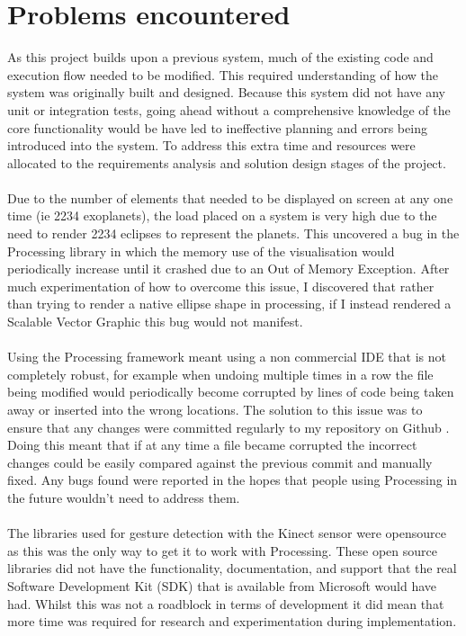 \section{Problems encountered}

As this project builds upon a previous system, much of the existing code and
execution flow needed to be modified. This required understanding of how the
system was originally built and designed. Because this system did not have any
unit or integration tests, going ahead without a comprehensive knowledge of the
core functionality would be have led to ineffective planning and errors being
introduced into the system. To address this extra time and resources were
allocated to the requirements analysis and solution design stages of the
project.
\\\\
Due to the number of elements that needed to be displayed on screen at any one
time (ie 2234 exoplanets), the load placed on a system is very high due to the
need to render 2234 eclipses to represent the planets. This uncovered a bug in
the Processing library in which the memory use of the visualisation would
periodically increase until it crashed due to an Out of Memory Exception. After
much experimentation of how to overcome this issue, I discovered that rather
than trying to render a native ellipse shape in processing, if I instead
rendered
a Scalable Vector Graphic this bug would not manifest. 
\\\\
Using the Processing framework meant using a non commercial IDE that is not
completely robust, for example when undoing multiple times in a row the file
being
modified would periodically become corrupted by lines of code being taken away
or inserted into the wrong locations. The solution to this issue was to ensure
that any changes were committed regularly to my repository on Github
\cite{github}. Doing this meant that if at any time a file became corrupted the
incorrect changes could be easily compared against the previous commit and
manually fixed. Any bugs found were reported in
the hopes that people using Processing in the future wouldn't need to address
them.
\\\\
The libraries used for gesture detection with the Kinect sensor were opensource
as this was the only way to get it to work with Processing. These open source
libraries did not have the functionality, documentation, and support that the
real Software Development Kit (SDK) that is available from Microsoft would have
had. Whilst this was not a roadblock in terms of development it did mean that
more time was required for research and experimentation during implementation.
\\\\

